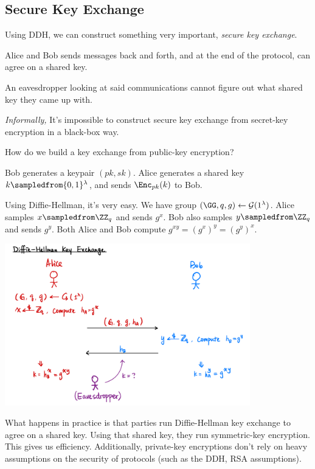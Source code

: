 \subsection{Secure Key Exchange}
Using DDH, we can construct something very important, \emph{secure key exchange}.
\begin{definition}
    Alice and Bob sends messages back and forth, and at the end of the protocol, can agree on a shared key.

    An eavesdropper looking at said communications cannot figure out what shared key they came up with.
\end{definition}
\begin{theorem}
    \emph{Informally,} It's impossible to construct secure key exchange from secret-key encryption in a black-box way.
\end{theorem}

\begin{ques*}
    How do we build a key exchange from public-key encryption?
\end{ques*}
Bob generates a keypair $(pk, sk)$. Alice generates a shared key $k\sampledfrom \{0, 1\}^\lambda$, and sends $\Enc_{pk}(k)$ to Bob.

Using Diffie-Hellman, it's very easy. We have group $(\GG, q, g)\leftarrow \mathcal{G}(1^\lambda)$. Alice samples $x\sampledfrom \ZZ_q$ and sends $g^x$. Bob also samples $y\sampledfrom \ZZ_q$ and sends $g^y$. Both Alice and Bob compute $g^{xy} = (g^x)^y = (g^y)^x$.

\begin{center}
    \includegraphics[width=0.8\textwidth]{images/2023-02-02/diffie-hellman.png}
\end{center}

What happens in practice is that parties run Diffie-Hellman key exchange to agree on a shared key. Using that shared key, they run symmetric-key encryption. This gives us efficiency. Additionally, private-key encryptions don't rely on heavy assumptions on the security of protocols (such as the DDH, RSA assumptions).

